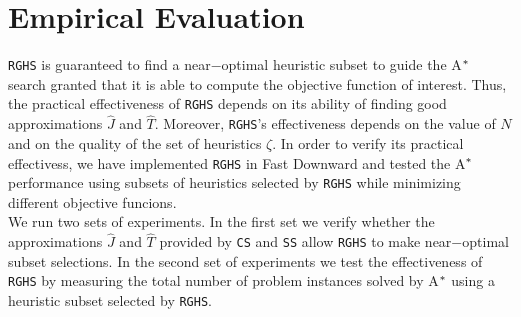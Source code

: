



\chapter{Empirical Evaluation}\label{ch:empirical_evaluation}


\texttt{RGHS} is guaranteed to find a near$-$optimal heuristic subset to guide the A$\sp{*}$ search granted that it is able to compute the objective function of interest. Thus, the practical effectiveness of \texttt{RGHS} depends on its ability of finding good approximations $\hat{J}$ and $\hat{T}$. Moreover, \texttt{RGHS}'s effectiveness depends on the value of $N$ and on the quality of the set of heuristics $\zeta$. In order to verify its practical effectivess, we have implemented \texttt{RGHS} in Fast Downward \cite{helmert2006fast} and tested the A$\sp{*}$ performance using subsets of heuristics selected by \texttt{RGHS} while minimizing different objective funcions.\\

We run two sets of experiments. In the first set we verify whether the approximations $\hat{J}$ and $\hat{T}$ provided by \texttt{CS} and \texttt{SS} allow \texttt{RGHS} to make near$-$optimal subset selections. In the second set of experiments we test the effectiveness of \texttt{RGHS} by measuring the total number of problem instances solved by A$\sp{*}$ using a heuristic subset selected by \texttt{RGHS}.\\

